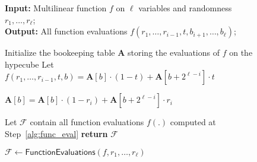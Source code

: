 \begin{figure}
\begin{algorithm}[H]
		\caption{$\mathcal{F}\leftarrow \textsf{FunctionEvaluations}(f,r_1,\ldots,r_\ell)$}\label{alg:evaluate}
		 \textbf{Input:} Multilinear function $f$ on $\ell$ variables and randomness $r_1,\ldots,r_\ell$;  \\
    \textbf{Output:} All function evaluations $f(r_1,\ldots, r_{i-1}, t, b_{i+1},\ldots, b_{\ell})$; 
   
		\begin{algorithmic}[1]
		 
\State \label{bookkeeping_step}Initialize the bookeeping table $\textbf{A}$  storing the evaluations of $f$ on the hypecube
				  \label{step:consider_b}
					 \State \label{alg:func_eval} Let $f(r_1,\ldots, r_{i-1}, t, b) = \textbf{A}[b]\cdot (1-t)+\textbf{A}[b+2^{\ell-i}]\cdot t$
					\EndFor
					
					
					
					\State\label{alg::dynamic::update} $\textbf{A}[b]=\textbf{A}[b]\cdot(1-r_i)+\textbf{A}[b+2^{\ell-i}]\cdot r_i$
				\EndFor
								
		
		\EndFor	
		\State Let $\mathcal{F}$ contain all function evaluations $f(.)$ computed at Step~\ref{alg:func_eval}
		\State \textbf{return} $\mathcal{F}$
		\end{algorithmic}
	\end{algorithm}
	
\end{figure}


